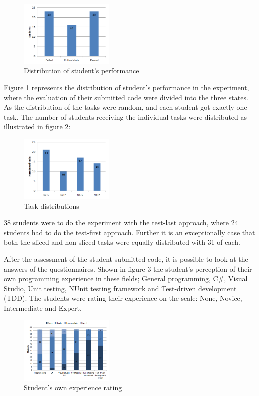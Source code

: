 \documentclass{sig-alternate-05-2015}
\begin{document}
\begin{figure}[H]
	\centering
	\includegraphics[width=0.4\textwidth]{img01}
	\caption{Distribution of student's performance}
\end{figure}

Figure 1 represents the distribution of student's performance in the experiment, where the evaluation of their submitted code were divided into the three states.\\

As the distribution of the tasks were random, and each student got exactly one task. The number of students receiving the individual tasks were distributed as illustrated in figure 2:

\begin{figure}[H]
	\centering
	\includegraphics[width=0.4\textwidth]{img02}
	\caption{Task distributions}
\end{figure}

38 students were to do the experiment with the test-last approach, where 24 students had to do the test-first approach. Further it is an exceptionally case that both the sliced and non-sliced tasks were equally distributed with 31 of each.

After the assessment of the student submitted code, it is possible to look at the answers of the questionnaires. Shown in figure 3 the student's perception of their own programming experience in these fields; General programming, C{\#}, Visual Studio, Unit testing, NUnit testing framework and Test-driven development (TDD).
The students were rating their experience on the scale: None, Novice, Intermediate and Expert.

\begin{figure}[H]
	\centering
	\includegraphics[width=0.4\textwidth]{img03}
	\caption{Student's own experience rating}
\end{figure}
\end{document}
